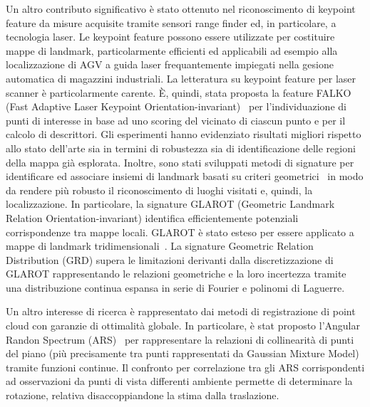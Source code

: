 \documentclass[11pt]{article}
\begin{document}

Un altro contributo significativo \`e stato ottenuto nel riconoscimento di keypoint feature da misure acquisite tramite sensori range finder ed, in particolare, a tecnologia laser. 
Le keypoint feature possono essere utilizzate per costituire mappe di landmark, particolarmente efficienti ed applicabili ad esempio alla localizzazione di AGV a guida laser frequantemente impiegati nella gesione automatica di magazzini industriali. 
La letteratura su keypoint feature per laser scanner \`e particolarmente carente. 
\`E, quindi, stata proposta la feature FALKO (Fast Adaptive Laser Keypoint Orientation-invariant)~\cite{kallasi2016ral} per l'individuazione di punti di interesse in base ad uno scoring del vicinato di ciascun punto e per il calcolo di descrittori. 
Gli esperimenti hanno evidenziato risultati migliori rispetto allo stato dell'arte sia in termini di robustezza sia di identificazione delle regioni della mappa gi\`a esplorata. 
Inoltre, sono stati sviluppati metodi di signature per identificare ed associare insiemi di landmark basati su criteri geometrici~\cite{lodirizzini2019ral, lodirizzini2017iros, kallasi2016iros} in modo da rendere pi\`u robusto il riconoscimento di luoghi visitati e, quindi, la localizzazione. 
In particolare, la signature GLAROT (Geometric Landmark Relation Orientation-invariant) identifica efficientemente potenziali corrispondenze tra mappe locali. 
GLAROT \`e stato esteso per essere applicato a mappe di landmark tridimensionali~\cite{lodirizzini2017iros}. 
La signature Geometric Relation Distribution (GRD) supera le limitazioni derivanti dalla discretizzazione di GLAROT rappresentando le relazioni geometriche e la loro incertezza tramite una distribuzione continua espansa in serie di Fourier e polinomi di Laguerre. 

Un altro interesse di ricerca \`e rappresentato dai metodi di registrazione di point cloud con garanzie di ottimalit\`a globale. 
In particolare, \`e stat proposto l'Angular Randon Spectrum (ARS)~\cite{lodirizzini2018pr} per rappresentare la relazioni di collinearit\`a di punti del piano (pi\`u precisamente tra punti rappresentati da Gaussian Mixture Model) tramite funzioni continue. 
Il confronto per correlazione tra gli ARS corrispondenti ad osservazioni da punti di vista differenti ambiente permette di determinare la rotazione, relativa disaccoppiandone la stima dalla traslazione. 
\end{document}
